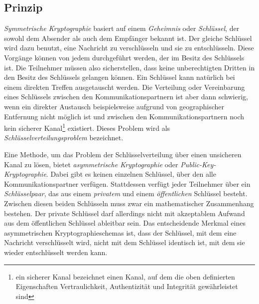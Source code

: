 \subsection{Prinzip}
\label{ch:Grundlagen:sec:PublicKeyCrypto:subsec:Prinzip}

\emph{Symmetrische Kryptographie} basiert auf einem \emph{Geheimnis}
oder \emph{Schl\"ussel}, der sowohl dem Absender als auch dem
Empf\"anger bekannt ist. Der gleiche Schl\"ussel wird dazu benutzt,
eine Nachricht zu verschl\"usseln und sie zu entschl\"usseln. Diese
Vorg\"ange k\"onnen von jedem durchgef\"uhrt werden, der im Besitz des
Schl\"ussels ist.  Die Teilnehmer m\"ussen also sicherstellen, dass
keine unberechtigten Dritten in den Besitz des Schl\"ussels gelangen
k\"onnen. Ein Schl\"ussel kann nat\"urlich bei einem direkten Treffen
ausgetauscht werden. Die Verteilung oder Vereinbarung eines
Schl\"ussels zwischen den Kommunikationspartnern ist aber dann
schwierig, wenn ein direkter Austausch beispielsweise aufgrund von
geographischer Entfernung nicht m\"oglich ist und zwischen den
Kommunikationspartnern noch kein sicherer Kanal\footnote{ein sicherer
  Kanal bezeichnet einen Kanal, auf dem die oben definierten
  Eigenschaften Vertraulichkeit, Authentizit\"at und Integrit\"at
  gew\"ahrleistet sind} existiert. Dieses Problem wird als
\emph{Schl\"usselverteilungsproblem} bezeichnet\cite{Menezes1996}. 

Eine Methode, um das Problem der Schl\"usselverteilung \"uber einen
unsicheren Kanal zu l\"osen, bietet \emph{asymmetrische Kryptographie}
oder \emph{Public-Key-Kryptographie}. Dabei gibt es keinen einzelnen
Schl\"ussel, \"uber den alle Kommunikationspartner
verf\"ugen. Stattdessen verf\"ugt jeder Teilnehmer \"uber ein
\emph{Schl\"usselpaar}, das aus einem \emph{privatem} und einem
\emph{\"offentlichen} Schl\"ussel besteht. Zwischen diesen beiden
Schl\"usseln muss zwar ein mathematischer Zusammenhang bestehen. Der
private Schl\"ussel darf allerdings nicht mit akzeptablem Aufwand aus
dem \"offentlichen Schl\"ussel ableitbar sein. Das entscheidende
Merkmal eines asymmetrischen Kryptographieschemas ist, dass der
Schl\"ussel, mit dem eine Nachricht verschl\"usselt wird, nicht mit
dem Schl\"ussel identisch ist, mit dem sie wieder entschl\"usselt
werden kann.

